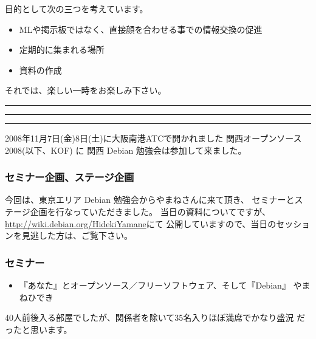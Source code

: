 \documentclass[mingoth,a4paper]{jsarticle}
\begin{document}
 目的として次の三つを考えています。
 \begin{itemize}
  \item MLや掲示板ではなく、直接顔を合わせる事での情報交換の促進
  \item 定期的に集まれる場所
  \item 資料の作成
 \end{itemize}

 それでは、楽しい一時をお楽しみ下さい。

\newpage

\begin{minipage}[b]{0.2\hsize}
 {}
\end{minipage}
\begin{minipage}[b]{0.8\hsize}
\hrule
\vspace{2mm}
\hrule
\setcounter{tocdepth}{1}
\tableofcontents
\vspace{2mm}
\hrule
\end{minipage}


2008年11月7日(金)8日(土)に大阪南港ATCで開かれました 関西オープンソース
2008(以下、KOF) に
関西 Debian 勉強会は参加して来ました。

\subsubsection{セミナー企画、ステージ企画}

今回は、東京エリア Debian 勉強会からやまねさんに来て頂き、
セミナーとステージ企画を行なっていただきました。
当日の資料についてですが、\url{http://wiki.debian.org/HidekiYamane}にて
公開していますので、当日のセッションを見逃した方は、ご覧下さい。

\subsubsection{セミナー}

\begin{itemize}
 \item 『あなた』とオープンソース／フリーソフトウェア、そして『Debian』 やまねひでき
\end{itemize}

40人前後入る部屋でしたが、関係者を除いて35名入りほぼ満席でかなり盛況
だったと思います。

\end{document}
